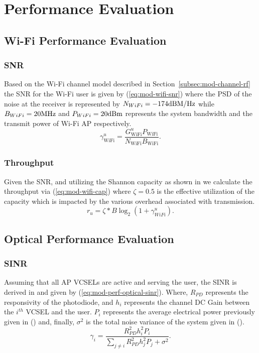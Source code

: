 \section{Performance Evaluation}
\label{sec:mod-perf}
\subsection{Wi-Fi Performance Evaluation}
\label{subsec:mod-perf-rf}
\subsubsection{SNR}
Based on the Wi-Fi channel model described in Section~\ref{subsec:mod-channel-rf} the SNR for the Wi-Fi user is given by (\ref{eq:mod-wifi-snr}) where the PSD of the noise at the receiver is represented by $N_{WiFi}=-174\space \text{dBM/Hz}$ while $B_{WiFi} = 20 \space \text{MHz}$ and $P_{WiFi}= 20 \space \text{dBm}$ represents the system bandwidth and the transmit power of Wi-Fi AP respectively.
\begin{equation}
    \gamma^{u}_{\text{WiFi}} = \frac{G^{u}_{\text{WiFi}} P_{\text{WiFi}}}{N_{\text{WiFi}} B_{\text{WiFi}}} .
    \label{eq:mod-wifi-snr}
\end{equation}
\subsubsection{Throughput}
Given the SNR, and utilizing the Shannon capacity as shown in \cite{wu_novel_2020-1} we calculate the throughput via (\ref{eq:mod-wifi-cap}) where $\zeta = 0.5$ is the effective utilization of the capacity which is impacted by the various overhead associated with transmission\cite{islam_throughput_2016}.
\begin{equation}
    r_u = \zeta * B \log_2(1 + \gamma_{WiFi}^u).
    \label{eq:mod-wifi-cap}
\end{equation}

\subsection{Optical Performance Evaluation}
\label{subsec:mod-perf-optical}
\subsubsection{SINR}
Assuming that all AP VCSELs are active and serving the user, the SINR is derived in \cite{sarbazi_tbs_2020} and given by (\ref{eq:mod-perf-optical-sinr}). Where, $R_{PD}$ represents the responsivity of the photodiode, and $h_i$ represents the channel DC Gain between the $i^{th}$ VCSEL and the user. $P_i$ represents the average electrical power previously given in () and, finally, $\sigma^2$ is the total noise variance of the system given in ().
\begin{equation}
    \gamma_i = \frac{R_{PD}^2h_i^2P_i}{\sum_{j\neq i}R_{PD}^2h_j^2P_j + \sigma^2}.
    \label{eq:mod-perf-optical-sinr}
\end{equation}

